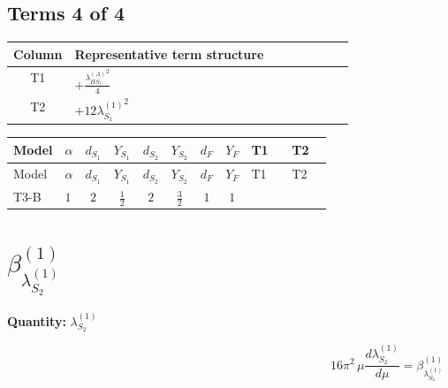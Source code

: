 \documentclass[8pt]{article}
\begin{document}
\begin{landscape}
\subsection*{Terms 4 of 4}
\begin{center}
\begin{tabular}{@{}c >{\raggedright\arraybackslash}p{0.82\linewidth}@{}}
\toprule
Column & Representative term structure \\
\midrule
T1 & \(\displaystyle +\frac{{\lambda_{HS_1}^{(A)}}^2}{4}\) \\
\midrule
T2 & \(\displaystyle +12 {\lambda_{S_1}^{(1)}}^2\) \\
\midrule
\bottomrule
\end{tabular}
\end{center}
\smallskip
\tiny
\begin{longtable}{@{}llcccccc >{\raggedright\arraybackslash}p{0.21\linewidth} >{\raggedright\arraybackslash}p{0.21\linewidth}@{}}
\toprule
Model & $\alpha$ & $d_{S_1}$ & $Y_{S_1}$ & $d_{S_2}$ & $Y_{S_2}$ & $d_F$ & $Y_F$ & T1 & T2 \\
\midrule
\endfirsthead
\toprule
Model & $\alpha$ & $d_{S_1}$ & $Y_{S_1}$ & $d_{S_2}$ & $Y_{S_2}$ & $d_F$ & $Y_F$ & T1 & T2 \\
\midrule
\endhead
T3-B & $1$ & $2$ & $\frac{1}{2}$ & $2$ & $\frac{3}{2}$ & $1$ & $1$ & \scriptsize\adjustbox{max width=\linewidth}{$\begin{gathered} +\frac{{\lambda_{HS_1}^{(A)}}^2}{4}\end{gathered}$} & \scriptsize\adjustbox{max width=\linewidth}{$\begin{gathered} +12 {\lambda_{S_1}^{(1)}}^2\end{gathered}$} \\
\midrule
\bottomrule
\end{longtable}
\clearpage
\section*{$\beta_{\lambda_{S_2}^{(1)}}^{(1)}$}
\noindent\textbf{Quantity: }$\lambda_{S_2}^{(1)}$\par\smallskip
\[16\pi^2\,\mu\frac{d \lambda_{S_2}^{(1)}}{d\mu}=\beta_{\lambda_{S_2}^{(1)}}^{(1)}\]

\end{landscape}
\end{document}
